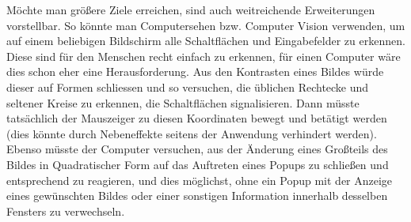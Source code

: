 Möchte man größere Ziele erreichen, sind auch weitreichende
Erweiterungen vorstellbar. So könnte man Computersehen bzw.
Computer Vision verwenden, um auf einem beliebigen Bildschirm
alle Schaltflächen und Eingabefelder zu erkennen. Diese sind
für den Menschen recht einfach zu erkennen, für einen
Computer wäre dies schon eher eine Herausforderung. Aus den
Kontrasten eines Bildes würde dieser auf Formen schliessen
und so versuchen, die üblichen Rechtecke und seltener Kreise
zu erkennen, die Schaltflächen signalisieren. Dann müsste
tatsächlich der Mauszeiger zu diesen Koordinaten bewegt
und betätigt werden (dies könnte durch Nebeneffekte seitens
der Anwendung verhindert werden). Ebenso müsste der Computer
versuchen, aus der Änderung eines Großteils des Bildes
in Quadratischer Form auf das Auftreten eines Popups zu 
schließen und entsprechend zu reagieren, und dies möglichst,
ohne ein Popup mit der Anzeige eines gewünschten Bildes
oder einer sonstigen Information innerhalb desselben
Fensters zu verwechseln.
